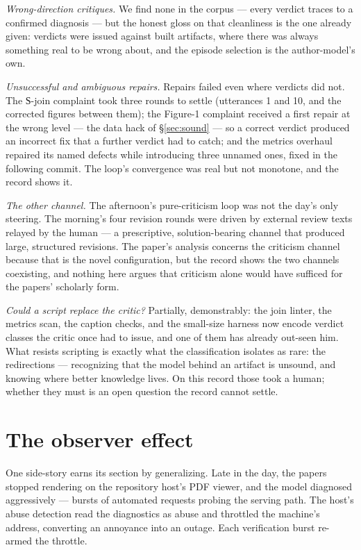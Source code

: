 \documentclass[11pt]{article}
\begin{document}
\emph{Wrong-direction critiques.} We find none in the corpus — every verdict traces to a confirmed diagnosis — but the honest gloss on that cleanliness is the one already given: verdicts were issued against built artifacts, where there was always something real to be wrong about, and the episode selection is the author-model's own.

\emph{Unsuccessful and ambiguous repairs.} Repairs failed even where verdicts did not. The Ѕ-join complaint took three rounds to settle (utterances 1 and 10, and the corrected figures between them); the Figure-1 complaint received a first repair at the wrong level — the data hack of \S\ref{sec:sound} — so a correct verdict produced an incorrect fix that a further verdict had to catch; and the metrics overhaul repaired its named defects while introducing three unnamed ones, fixed in the following commit. The loop's convergence was real but not monotone, and the record shows it.

\emph{The other channel.} The afternoon's pure-criticism loop was not the day's only steering. The morning's four revision rounds were driven by external review texts relayed by the human — a prescriptive, solution-bearing channel that produced large, structured revisions. The paper's analysis concerns the criticism channel because that is the novel configuration, but the record shows the two channels coexisting, and nothing here argues that criticism alone would have sufficed for the papers' scholarly form.

\emph{Could a script replace the critic?} Partially, demonstrably: the join linter, the metrics scan, the caption checks, and the small-size harness now encode verdict classes the critic once had to issue, and one of them has already out-seen him. What resists scripting is exactly what the classification isolates as rare: the redirections — recognizing that the model behind an artifact is unsound, and knowing where better knowledge lives. On this record those took a human; whether they must is an open question the record cannot settle.

\section{The observer effect}\label{sec:observer}

One side-story earns its section by generalizing. Late in the day, the papers stopped rendering on the repository host's PDF viewer, and the model diagnosed aggressively — bursts of automated requests probing the serving path. The host's abuse detection read the diagnostics as abuse and throttled the machine's address, converting an annoyance into an outage. Each verification burst re-armed the throttle.
\end{document}

